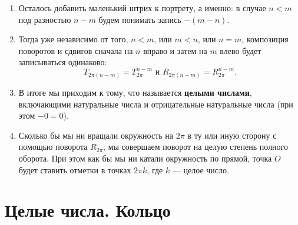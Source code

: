 \begin{enumerate}
\item Осталось добавить маленький штрих к портрету, а именно: в случае $n<m$ под разностью $n-m$ будем понимать запись $-(m-n)$.
\item Тогда уже независимо от того, $n<m$, или $m<n$, или $n=m$, композиция поворотов и сдвигов сначала на $n$ вправо и затем на $m$ влево будет записываться одинаково:
$$
T_{2\pi(n-m)}=T_{2\pi}^{n-m}\mbox{ и }R_{2\pi(n-m)}=R_{2\pi}^{n-m}.
$$
\item В итоге мы приходим к тому, что называется \textbf{целыми числами}, включающими натуральные числа и отрицательные натуральные числа (при этом $-0=0$).
\item Сколько бы мы ни вращали окружность на $2\pi$ в ту или иную сторону с помощью поворота $R_{2\pi}$, мы совершаем поворот на целую степень полного оборота. При этом как бы мы ни катали окружность по прямой, точка $O$ будет ставить отметки в точках $2\pi k$, где $k$ --- целое число.
\end{enumerate}





\section{Целые числа. Кольцо}

